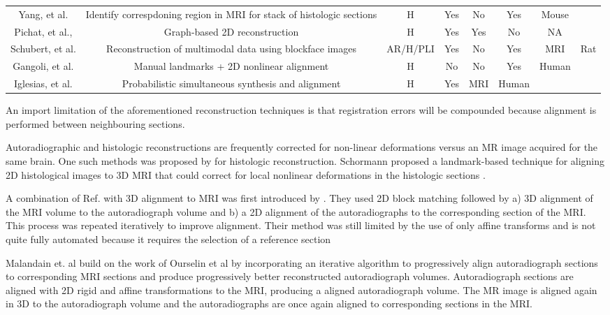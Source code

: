 \documentclass[12pt]{article}
\begin{document}
\begin{center}
\begin{tabular}{ | c | c | c | c | c | c | c | }
    Yang, et al. \cite{Yang2012} & Identify correspdoning region in MRI for stack of histologic sections  & H & Yes & No & Yes & Mouse \\ 
    Pichat, et al., \cite{Pichat2015} & Graph-based 2D reconstruction & H & Yes & Yes & No & NA \\
    Schubert, et al. \cite{Schubert2016} & Reconstruction of multimodal data using blockface images & AR/H/PLI & Yes & No & Yes & MRI & Rat \\
    Gangoli, et al. \cite{Gangolli2017} & Manual landmarks + 2D nonlinear alignment  & H & No & No & Yes & Human \\
    Iglesias, et al. \cite{Iglesias2018} & Probabilistic simultaneous synthesis and alignment &  H & Yes & MRI & Human \\ 
    \hline
    
\end{tabular}
\end{center}

An import limitation of the aforementioned reconstruction techniques is that registration errors will be compounded because alignment is performed between neighbouring sections. 

Autoradiographic and histologic reconstructions are frequently corrected for non-linear deformations versus an MR image acquired for the same brain. One such methods was proposed by \cite{Schormann1993} for histologic reconstruction. Schormann proposed a landmark-based technique for aligning 2D histological images to 3D MRI that could correct for local nonlinear deformations in the histologic sections \cite{Shormann1995}. 

A combination of Ref. \cite{Ourselin2001} with 3D alignment to MRI was first introduced by \cite{Malandain2004}. They used 2D block matching followed by a) 3D alignment of the MRI volume to the autoradiograph volume and b) a 2D alignment of the autoradiographs to the corresponding section of the MRI. This process was repeated iteratively to improve alignment. Their method was still limited by the use of only affine transforms and is not quite fully automated because it requires the selection of a reference section

Malandain et. al \cite{Malandain2004} build on the work of Ourselin et al \cite{Ourselin2001} by incorporating an iterative algorithm to progressively align autoradiograph sections to corresponding MRI sections and produce progressively better reconstructed autoradiograph volumes. Autoradiograph sections are aligned with 2D rigid and affine transformations to the MRI, producing a aligned autoradiograph volume. The MR image is aligned again in 3D to the autoradiograph volume and the autoradiographs are once again aligned to corresponding sections in the MRI.
\end{document}
